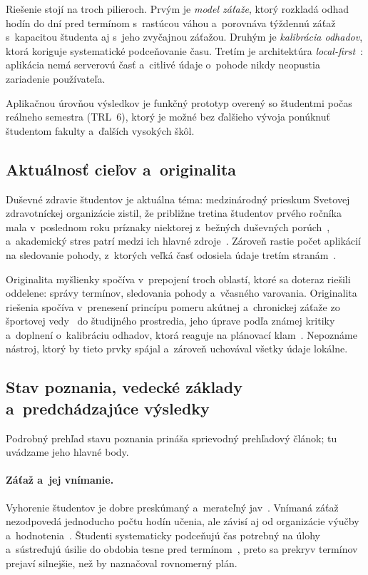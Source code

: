 \documentclass[11pt,a4paper]{article}
\begin{document}
Riešenie stojí na troch pilieroch. Prvým je \emph{model záťaže}, ktorý
rozkladá odhad hodín do dní pred termínom s~rastúcou váhou a~porovnáva
týždennú záťaž s~kapacitou študenta aj s~jeho zvyčajnou záťažou. Druhým je
\emph{kalibrácia odhadov}, ktorá koriguje systematické podceňovanie času.
Tretím je architektúra \emph{local-first}~\cite{Kleppmann:LocalFirst}:
aplikácia nemá serverovú časť a~citlivé údaje o~pohode nikdy neopustia
zariadenie používateľa.

Aplikačnou úrovňou výsledkov je funkčný prototyp overený so študentmi
počas reálneho semestra (TRL~6), ktorý je možné bez ďalšieho vývoja
ponúknuť študentom fakulty a~ďalších vysokých škôl.

\subsection{Aktuálnosť cieľov a~originalita}

Duševné zdravie študentov je aktuálna téma: medzinárodný prieskum
Svetovej zdravotníckej organizácie zistil, že približne tretina študentov
prvého ročníka mala v~poslednom roku príznaky niektorej z~bežných duševných
porúch~\cite{Auerbach:WMH}, a~akademický stres patrí medzi ich hlavné
zdroje~\cite{Pascoe:Stress}. Zároveň rastie počet aplikácií na sledovanie
pohody, z~ktorých veľká časť odosiela údaje tretím
stranám~\cite{Huckvale:Privacy}.

Originalita myšlienky spočíva v~prepojení troch oblastí, ktoré sa doteraz
riešili oddelene: správy termínov, sledovania pohody a~včasného varovania.
Originalita riešenia spočíva v~prenesení princípu pomeru akútnej
a~chronickej záťaže zo športovej vedy~\cite{Gabbett:ACWR} do študijného
prostredia, jeho úprave podľa známej kritiky~\cite{Impellizzeri:ACWR}
a~doplnení o~kalibráciu odhadov, ktorá reaguje na plánovací
klam~\cite{Buehler:Planning}. Nepoznáme nástroj, ktorý by tieto prvky
spájal a~zároveň uchovával všetky údaje lokálne.

\subsection{Stav poznania, vedecké základy a~predchádzajúce výsledky}

Podrobný prehľad stavu poznania prináša sprievodný prehľadový článok;
tu uvádzame jeho hlavné body.

\paragraph{Záťaž a~jej vnímanie.}
Vyhorenie študentov je dobre preskúmaný a~merateľný
jav~\cite{Schaufeli:Burnout}. Vnímaná záťaž nezodpovedá jednoducho počtu
hodín učenia, ale závisí aj od organizácie výučby a~hodnotenia~\cite{Kember:Workload}.
Študenti systematicky podceňujú čas potrebný na úlohy~\cite{Buehler:Planning}
a~sústreďujú úsilie do obdobia tesne pred termínom~\cite{Steel:Procrastination},
preto sa prekryv termínov prejaví silnejšie, než by naznačoval rovnomerný plán.
\end{document}
